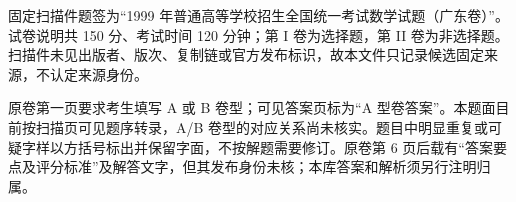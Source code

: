 

\begin{gktip}
固定扫描件题签为“1999 年普通高等学校招生全国统一考试数学试题（广东卷）”。试卷说明共 150 分、考试时间 120 分钟；第 I 卷为选择题，第 II 卷为非选择题。扫描件未见出版者、版次、复制链或官方发布标识，故本文件只记录候选固定来源，不认定来源身份。

原卷第一页要求考生填写 A 或 B 卷型；可见答案页标为“A 型卷答案”。本题面目前按扫描页可见题序转录，A/B 卷型的对应关系尚未核实。题目中明显重复或可疑字样以方括号标出并保留字面，不按解题需要修订。原卷第 6 页后载有“答案要点及评分标准”及解答文字，但其发布身份未核；本库答案和解析须另行注明归属。
\end{gktip}


